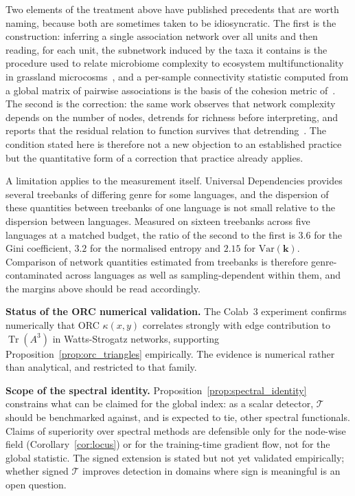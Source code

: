 \documentclass[11pt,a4paper]{article}
\begin{document}
Two elements of the treatment above have published precedents that are worth
naming, because both are sometimes taken to be idiosyncratic. The first is the
construction: inferring a single association network over all units and then
reading, for each unit, the subnetwork induced by the taxa it contains is the
procedure used to relate microbiome complexity to ecosystem multifunctionality
in grassland microcosms~\cite{wagg2019}, and a per-sample connectivity
statistic computed from a global matrix of pairwise associations is the basis
of the cohesion metric of~\cite{herren2017}. The second is the correction:
the same work observes that network complexity depends on the number of nodes,
detrends for richness before interpreting, and reports that the residual
relation to function survives that detrending~\cite{wagg2019}. The condition
stated here is therefore not a new objection to an established practice but
the quantitative form of a correction that practice already applies.

A limitation applies to the measurement itself. Universal Dependencies
provides several treebanks of differing genre for some languages, and the
dispersion of these quantities between treebanks of one language is not
small relative to the dispersion between languages. Measured on sixteen
treebanks across five languages at a matched budget, the ratio of the
second to the first is $3.6$ for the Gini coefficient, $3.2$ for the
normalised entropy and $2.15$ for $\mathrm{Var}(\mathbf{k})$. Comparison of
network quantities estimated from treebanks is therefore genre-contaminated
across languages as well as sampling-dependent within them, and the margins
above should be read accordingly.

\textbf{Status of the ORC numerical validation.} The Colab~3 experiment
confirms numerically that ORC $\kappa(x,y)$ correlates strongly with edge
contribution to $\operatorname{Tr}(A^3)$ in Watts-Strogatz networks,
supporting Proposition~\ref{prop:orc_triangles} empirically. The evidence
is numerical rather than analytical, and restricted to that family.

\textbf{Scope of the spectral identity.}
Proposition~\ref{prop:spectral_identity} constrains what can be claimed for
the global index: as a scalar detector, $\mathcal{T}$ should be benchmarked
against, and is expected to tie, other spectral functionals. Claims of
superiority over spectral methods are defensible only for the node-wise
field (Corollary~\ref{cor:locus}) or for the training-time gradient flow,
not for the global statistic. The signed extension is stated but not yet
validated empirically; whether signed $\mathcal{T}$ improves detection in
domains where sign is meaningful is an open question.
\end{document}
